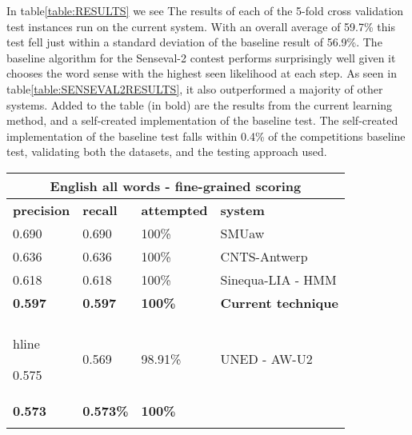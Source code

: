In table\ref{table:RESULTS} we see The results of each of the 5-fold cross
validation test instances run on the current system.  With an overall average of
59.7\% this test fell just within a standard deviation of the baseline result of
56.9\%. The baseline algorithm for the Senseval-2 contest performs surprisingly
well given it chooses the word sense with the highest seen likelihood at each
step.  As seen in table\ref{table:SENSEVAL2RESULTS}, it also outperformed a
majority of other systems. Added to the table (in bold) are the results from the
current learning method, and a self-created implementation of the baseline test.
The self-created implementation of the baseline test falls within 0.4\% of the
competitions baseline test, validating both the datasets, and the testing
approach used.

\begin{table}[htp]     \begin{tabular}{|l|l|l|l|}         \hline
\multicolumn{4}{|c|}{\bf English all words - fine-grained scoring } \\
\hline         {\bf precision } & {\bf recall} & {\bf attempted} & {\bf system}
\\ \hline          0.690   &   0.690   &   100\%   &       SMUaw \\ \hline
0.636   &   0.636   &   100\%   &       CNTS-Antwerp \\ \hline         0.618   &
0.618   &   100\%   &       Sinequa-LIA - HMM \\ \hline
		
		{\bf 0.597} & {\bf 0.597} & {\bf 100\% } &    {\bf Current technique} \\
		{\\hline
		
		0.575   &   0.569   &   98.91\% &UNED - AW-U2 \\ \hline
		
		{\bf 0.573} & {\bf 0.573\% } & {\bf 100\%} &  {\bf self-created baseline
		{\implementation } \\ \hline
		
}}
\end{tabular}
\end{table}
